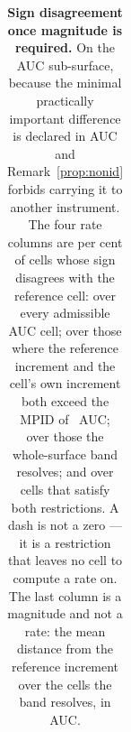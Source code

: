 \begin{table}[t]
{\begin{tabular}{llllllllll}
\bottomrule
\end{tabular}%
}
\caption{\textbf{Sign disagreement once magnitude is required.} On the AUC sub-surface, because the minimal practically important difference is declared in AUC and Remark~\ref{prop:nonid} forbids carrying it to another instrument. The four rate columns are per cent of cells whose sign disagrees with the reference cell: over every admissible AUC cell; over those where the reference increment and the cell's own increment both exceed the MPID of \mpidAuc\ AUC; over those the whole-surface band resolves; and over cells that satisfy both restrictions. A dash is not a zero --- it is a restriction that leaves no cell to compute a rate on. The last column is a magnitude and not a rate: the mean distance from the reference increment over the cells the band resolves, in AUC.}
\label{tab:mpid}
\end{table}
